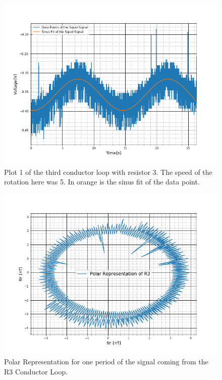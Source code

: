 \begin{figure}[ht]
	\includegraphics[scale=0.5]{Bild/r3_5_1}
	\centering
	\caption[Plot of third conductor loop 1]{Plot 1 of the third conductor loop with resistor 3. The speed of the rotation here was 5. In orange is the sinus fit of the data point.}
\end{figure}
\begin{figure}[ht]
	\includegraphics[scale=0.5]{Bild/R3}
	\centering
	\caption[Polar Representation for R3 Conductor Loop]{Polar Representation for one period of the signal coming from the R3 Conductor Loop.}
\end{figure}

